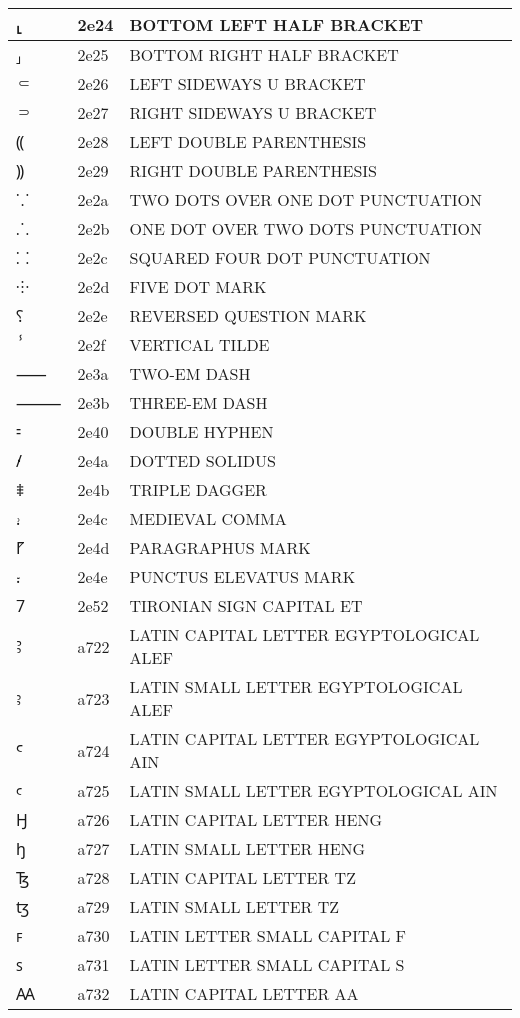 \documentclass[12pt,letterpaper,openany]{book}
\begin{document}
\begin{center}
\begin{supertabular}{|m{0.25in}|m{0.5in}|m{4in}|}
⸤ & 2e24 & BOTTOM LEFT HALF BRACKET\\\hline
⸥ & 2e25 & BOTTOM RIGHT HALF BRACKET\\\hline
⸦ & 2e26 & LEFT SIDEWAYS U BRACKET\\\hline
⸧ & 2e27 & RIGHT SIDEWAYS U BRACKET\\\hline
⸨ & 2e28 & LEFT DOUBLE PARENTHESIS\\\hline
⸩ & 2e29 & RIGHT DOUBLE PARENTHESIS\\\hline
⸪ & 2e2a & TWO DOTS OVER ONE DOT PUNCTUATION\\\hline
⸫ & 2e2b & ONE DOT OVER TWO DOTS PUNCTUATION\\\hline
⸬ & 2e2c & SQUARED FOUR DOT PUNCTUATION\\\hline
⸭ & 2e2d & FIVE DOT MARK\\\hline
⸮ & 2e2e & REVERSED QUESTION MARK\\\hline
ⸯ & 2e2f & VERTICAL TILDE\\\hline
⸺ & 2e3a & TWO-EM DASH\\\hline
⸻ & 2e3b & THREE-EM DASH\\\hline
⹀ & 2e40 & DOUBLE HYPHEN\\\hline
⹊ & 2e4a & DOTTED SOLIDUS\\\hline
⹋ & 2e4b & TRIPLE DAGGER\\\hline
⹌ & 2e4c & MEDIEVAL COMMA\\\hline
⹍ & 2e4d & PARAGRAPHUS MARK\\\hline
⹎ & 2e4e & PUNCTUS ELEVATUS MARK\\\hline
⹒ & 2e52 & TIRONIAN SIGN CAPITAL ET\\\hline
Ꜣ & a722 & LATIN CAPITAL LETTER EGYPTOLOGICAL ALEF\\\hline
ꜣ & a723 & LATIN SMALL LETTER EGYPTOLOGICAL ALEF\\\hline
Ꜥ & a724 & LATIN CAPITAL LETTER EGYPTOLOGICAL AIN\\\hline
ꜥ & a725 & LATIN SMALL LETTER EGYPTOLOGICAL AIN\\\hline
Ꜧ & a726 & LATIN CAPITAL LETTER HENG\\\hline
ꜧ & a727 & LATIN SMALL LETTER HENG\\\hline
Ꜩ & a728 & LATIN CAPITAL LETTER TZ\\\hline
ꜩ & a729 & LATIN SMALL LETTER TZ\\\hline
ꜰ & a730 & LATIN LETTER SMALL CAPITAL F\\\hline
ꜱ & a731 & LATIN LETTER SMALL CAPITAL S\\\hline
Ꜳ & a732 & LATIN CAPITAL LETTER AA\\\hline

\end{supertabular}
\end{center}
\end{document}
